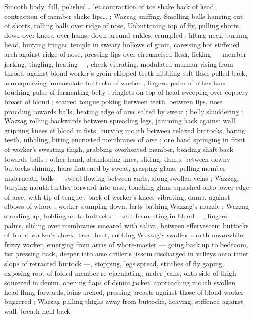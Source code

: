 Smooth body, full, polished{\ldots} let contraction of toe shake back of 
head, contraction of member shake lips{\ldots}{\gr} ; Wazzag sniffing, 
Smelling balls hanging out of shorts, rolling balls over ridge of nose, 
Unbuttoning top of fly, pulling shorts down over knees, over hams, 
down around ankles, crumpled ; lifting neck, turning head, burying 
fringed temple in sweaty hollows of groin, caressing hot stiffened 
arch against ridge of nose, pressing lips over circumcised flesh, 
licking --- member jerking, tingling, heating ---, cheek vibrating, 
modulated murmur rising from throat, against blond worker's groin 
chipped teeth nibbling soft flesh pulled back, arm squeezing 
immaculate buttocks of worker ; fingers, palm of other hand touching 
pulse of fermenting belly ; ringlets on top of head sweeping over 
coppery breast of blond ; scarred tongue poking between teeth. 
between lips, nose prodding towards balls, heating edge of arse 
salted by sweat ; belly shuddering ; Wazzag rolling backwards 
between spreading legs, jamming back against wall, gripping knees 
of blond in fists, burying mouth between relaxed buttocks, baring 
teeth, nibbling, biting encrusted membranes of arse ; one hand 
springing in front of worker's sweating thigh, grabbing overheated 
member, bending shaft back towards balls ; other hand, abandoning 
knee, sliding, damp, between downy buttocks shining, hairs flattened 
by sweat, grasping glans, pulling member underneath balls --- sweat 
flowing between curls, along swollen veins ; Wazzag, burying mouth 
further forward into arse, touching glans squashed onto lower edge 
of arse, with tip of tongue ; back of worker's knees vibrating, damp. 
against elbows of whore ; worker slumping down, farts bathing 
Wazzag's muzzle ; Wazzag standing up, holding on to buttocks --- 
shit fermenting in blood ---, fingers, palms, sliding over membranes 
smeared with saliva, between effervescent buttocks of blond 
worker's cheek, head bent, rubbing Wazzag's swollen mouth 
meanwhile, frizzy worker, emerging from arms of whore-master --- 
going back up to bedroom, fist pressing back, deeper into arse 
driller's jissom discharged in volleys onto inner slope of retracted 
buttock ---, stopping, legs spread, stitches of fly gaping, exposing 
root of folded member re-ejaculating, under jeans, onto side of thigh 
squeezed in denim, opening flaps of denim jacket. approaching 
mouth swollen, head flung forwards, loins arched, pressing breasts 
against those of blond worker buggered ; Wazzag pulling thighs 
away from buttocks, heaving, stiffened against wall, breath held back 
